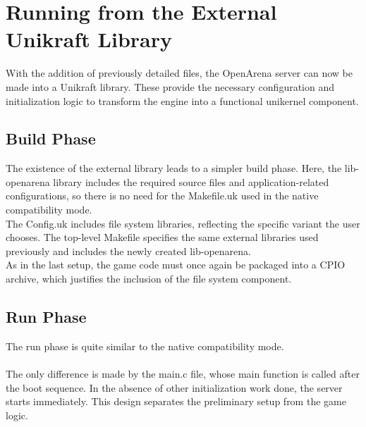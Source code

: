 \section{Running from the External Unikraft Library}
With the addition of previously detailed files, the OpenArena server can now be made into a Unikraft library.\@
These provide the necessary configuration and initialization logic to transform the engine into a functional unikernel component.
\subsection{Build Phase}
The existence of the external library leads to a simpler build phase.\@
Here, the lib-openarena library includes the required source files and application-related configurations, so there is no need for the Makefile.uk used in the native compatibility mode. \\
The Config.uk includes file system libraries, reflecting the specific variant the user chooses.
The top-level Makefile specifies the same external libraries used previously and includes the newly created
lib-openarena. \\
As in the last setup, the game code must once again be packaged into a CPIO archive, which justifies the inclusion
of the file system component.
\newpage
\subsection{Run Phase}
The run phase is quite similar to the native compatibility mode. \\ \\
The only difference is made by the main.c file, whose main function is called after the boot sequence. In the absence of other initialization work done,
the server starts immediately. This design separates the preliminary setup from the game logic.
